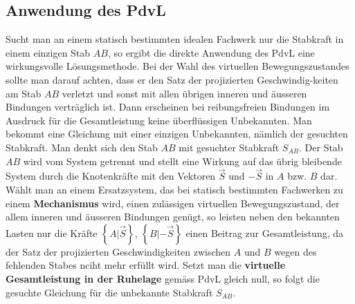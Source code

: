 \subsection{Anwendung des PdvL} 
Sucht man an einem statisch bestimmten idealen Fachwerk nur die Stabkraft in einem einzigen Stab $AB$, so ergibt die direkte Anwendung des PdvL eine wirkungsvolle Lösungsmethode. Bei der Wahl des virtuellen Bewegungszustandes sollte man darauf achten, dass er den Satz der projizierten Geschwindig-keiten am Stab $AB$ verletzt und sonst mit allen übrigen inneren und äusseren Bindungen verträglich ist. Dann erscheinen bei reibungsfreien Bindungen im Ausdruck für die Gesamtleistung keine überflüssigen Unbekannten. Man bekommt eine Gleichung mit einer einzigen Unbekannten, nämlich der gesuchten Stabkraft.
\newline\newline
Man denkt sich den Stab $AB$ mit gesuchter Stabkraft $S_{AB}$. Der Stab $AB$ wird vom System getrennt und stellt eine Wirkung auf das übrig bleibende System durch die Knotenkräfte mit den Vektoren $\overrightarrow{S}$ und $-\overrightarrow{S}$ in $A$ bzw. $B$ dar. Wählt man an einem Ersatzsystem, das bei statisch bestimmten Fachwerken zu einem \textbf{Mechanismus} wird, einen zulässigen virtuellen Bewegungszustand, der allem inneren und äusseren Bindungen genügt, so leisten neben den bekannten Lasten nur die Kräfte $\left\{A | \overrightarrow{S}\right\}$, $\left\{B | -\overrightarrow{S}\right\}$ einen Beitrag zur Gesamtleistung, da der Satz der projizierten Geschwindigkeiten zwischen $A$ und $B$ wegen des fehlenden Stabes nciht mehr erfüllt wird. Setzt man die \textbf{virtuelle Gesamtleistung in der Ruhelage} gemäss PdvL gleich null, so folgt die gesuchte Gleichung für die unbekannte Stabkraft $S_{AB}$.